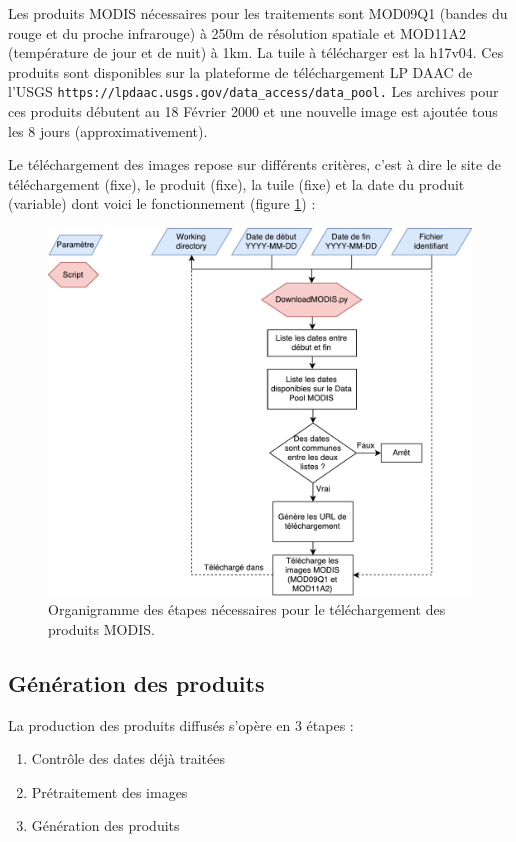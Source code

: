 \documentclass[10pt,a4paper]{article}
\begin{document}
Les produits MODIS nécessaires pour les traitements sont MOD09Q1 (bandes du rouge et du proche infrarouge) à 250m de résolution spatiale et MOD11A2 (température de jour et de nuit) à 1km. La tuile à télécharger est la h17v04. Ces produits sont disponibles sur la plateforme de téléchargement LP DAAC de l'USGS \verb!https://lpdaac.usgs.gov/data_access/data_pool.! Les archives pour ces produits débutent au 18 Février 2000 et une nouvelle image est ajoutée tous les 8 jours (approximativement).\smallbreak

Le téléchargement des images repose sur différents critères, c'est à dire le site de téléchargement (fixe), le produit (fixe), la tuile (fixe) et la date du produit (variable) dont voici le fonctionnement (figure \ref{orgDL}) :\newpage

\begin{figure}[!h]
\centering
\includegraphics[scale=0.5]{img/orgDownload.pdf}
\caption{Organigramme des étapes nécessaires pour le téléchargement des produits MODIS.}
\label{orgDL}
\end{figure}

\subsection{Génération des produits}

La production des produits diffusés s'opère en 3 étapes :

\begin{enumerate}
\item Contrôle des dates déjà traitées
\item Prétraitement des images
\item Génération des produits
\end{enumerate}
\end{document}
